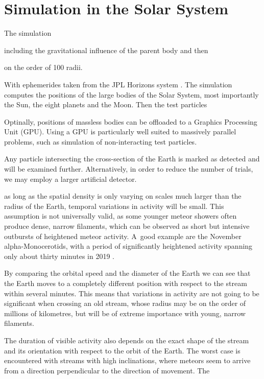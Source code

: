 \section{Simulation in the Solar System} \label{as}
    The simulation 

    including the gravitational influence of the parent body and then

    on the order of 100 radii.

    With ephemerides taken from the JPL Horizons system \citep{...}.
    The simulation computes the positions of the large bodies of the Solar System, most importantly the Sun,
    the eight planets and the Moon. Then the test particles

    Optinally, positions of massless bodies can be offloaded to a Graphics Processing Unit (GPU).
    Using a GPU is particularly well suited to massively parallel problems, such as simulation of non-interacting test particles.

    Any particle intersecting the cross-section of the Earth is marked as detected and will be examined further.
    Alternatively, in order to reduce the number of trials, we may employ a larger artificial detector.


    as long as the spatial density is only varying on scales much larger than the radius of the Earth,
    temporal variations in activity will be small.
    This assumption is not universally valid, as some younger meteor showers often produce dense, narrow filaments,
    which can be observed as short but intensive outbursts of heightened meteor activity.
    A~good example are the November alpha-Monocerotids, with a period of significantly
    heightened activity spanning only about thirty minutes in 2019 \citep{CBET4692}.

    By comparing the orbital speed and the diameter of the Earth we can see that the Earth moves
    to a completely different position with respect to the stream within several minutes.
    This means that variations in activity are not going to be significant when crossing an old stream,
    whose radius may be on the order of millions of kilometres, but will be of extreme importance with young, narrow filaments.

    The duration of visible activity also depends on the exact shape of the stream and its orientation with respect to the orbit of the Earth.
    The worst case is encountered with streams with high inclinations, where meteors seem to arrive from a direction perpendicular
    to the direction of movement. The 

